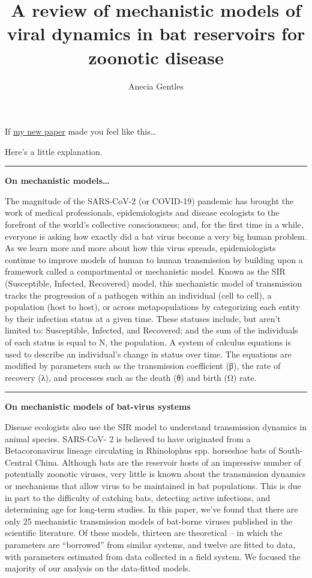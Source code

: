\documentclass[
]{article}
\title{A review of mechanistic models of viral dynamics in bat reservoirs for
zoonotic disease}
\author{Anecia Gentles}
\date{}
\begin{document}
\maketitle

If \href{https://doi.org/10.1080/20477724.2020.1833161}{my new paper}
made you feel like this\ldots{}

Here's a little explanation.

\begin{center}\rule{0.5\linewidth}{0.5pt}\end{center}

\textbf{On mechanistic models\ldots{}}

The magnitude of the SARS-CoV-2 (or COVID-19) pandemic has brought the
work of medical professionals, epidemiologists and disease ecologists to
the forefront of the world's collective consciousness; and, for the
first time in a while, everyone is asking how exactly did a bat virus
become a very big human problem. As we learn more and more about how
this virus spreads, epidemiologists continue to improve models of human
to human transmission by building upon a framework called a
compartmental or mechanistic model. Known as the SIR (Susceptible,
Infected, Recovered) model, this mechanistic model of transmission
tracks the progression of a pathogen within an individual (cell to
cell), a population (host to host), or across metapopulations by
categorizing each entity by their infection status at a given time.
These statuses include, but aren't limited to: Susceptible, Infected,
and Recovered; and the sum of the individuals of each status is equal to
N, the population. A system of calculus equations is used to describe an
individual's change in status over time. The equations are modified by
parameters such as the transmission coefficient (β), the rate of
recovery (λ), and processes such as the death (θ) and birth (Ω) rate.

\begin{center}\rule{0.5\linewidth}{0.5pt}\end{center}

\textbf{On mechanistic models of bat-virus systems}

Disease ecologists also use the SIR model to understand transmission
dynamics in animal species. SARS-CoV- 2 is believed to have originated
from a Betacoronavirus lineage circulating in Rhinolophus spp. horseshoe
bats of South-Central China. Although bats are the reservoir hosts of an
impressive number of potentially zoonotic viruses, very little is known
about the transmission dynamics or mechanisms that allow virus to be
maintained in bat populations. This is due in part to the difficulty of
catching bats, detecting active infections, and determining age for
long-term studies. In this paper, we've found that there are only 25
mechanistic transmission models of bat-borne viruses published in the
scientific literature. Of these models, thirteen are theoretical -- in
which the parameters are ``borrowed'' from similar systems, and twelve
are fitted to data, with parameters estimated from data collected in a
field system. We focused the majority of our analysis on the data-fitted
models.
\end{document}
